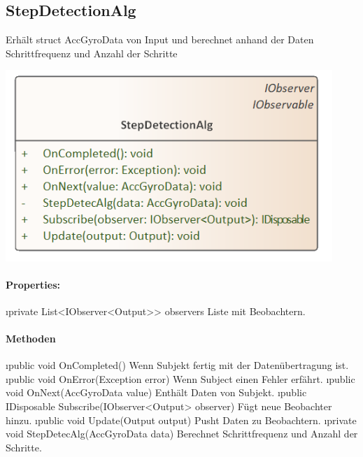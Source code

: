 \documentclass[../entwurf.tex]{subfiles}
\begin{document}
    \subsection{StepDetectionAlg}
        Erhält struct AccGyroData von Input und berechnet anhand der Daten Schrittfrequenz und Anzahl der Schritte
        \begin{center}
            \includegraphics[page=1,width=350pt,keepaspectratio]{../uml_klassen/StepDetectionLib/StepDetectionAlg.png}
        \end{center}
        \paragraph{Properties:}
        \begin{itemize}
            \i{private List<IObserver<Output>> observers} Liste mit Beobachtern.
        \end{itemize}
    
        \paragraph{Methoden}
        \begin{itemize}
            \i{public void OnCompleted()} Wenn Subjekt fertig mit der Datenübertragung ist.
            \i{public void OnError(Exception error)} Wenn Subject einen Fehler erfährt.
            \i{public void OnNext(AccGyroData value)} Enthält Daten von Subjekt.
            \i{public IDisposable Subscribe(IObserver<Output> observer)} Fügt neue Beobachter hinzu.
            \i{public void Update(Output output)} Pusht Daten zu Beobachtern.
            \i{private void StepDetecAlg(AccGyroData data)} Berechnet Schrittfrequenz und Anzahl der Schritte.
        \end{itemize}
    
\end{document}
